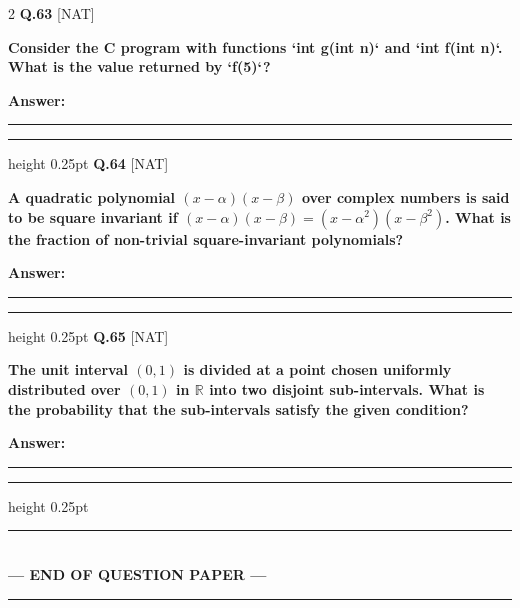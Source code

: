 \documentclass[a4paper,10pt,twoside]{article}
\begin{document}
\begin{multicols}{2}
\noindent\textbf{Q.63} \hfill {\footnotesize\textsf{[NAT]}}
\par\vspace{2pt}
{\bfseries Consider the C program with functions `int g(int n)` and `int f(int n)`. What is the value returned by `f(5)`? \par}
\par\vspace{3pt}\noindent\textbf{Answer:} \rule{3.2cm}{0.4pt}
\par\vspace{6pt}\hrule height 0.25pt\vspace{6pt}
\noindent\textbf{Q.64} \hfill {\footnotesize\textsf{[NAT]}}
\par\vspace{2pt}
{\bfseries A quadratic polynomial $(x - \alpha)(x - \beta)$ over complex numbers is said to be square invariant if $(x - \alpha)(x - \beta) = (x - \alpha^2)(x - \beta^2)$. What is the fraction of non-trivial square-invariant polynomials? \par}
\par\vspace{3pt}\noindent\textbf{Answer:} \rule{3.2cm}{0.4pt}
\par\vspace{6pt}\hrule height 0.25pt\vspace{6pt}
\noindent\textbf{Q.65} \hfill {\footnotesize\textsf{[NAT]}}
\par\vspace{2pt}
{\bfseries The unit interval $(0, 1)$ is divided at a point chosen uniformly distributed over $(0, 1)$ in $\mathbb{R}$ into two disjoint sub-intervals. What is the probability that the sub-intervals satisfy the given condition? \par}
\par\vspace{3pt}\noindent\textbf{Answer:} \rule{3.2cm}{0.4pt}
\par\vspace{6pt}\hrule height 0.25pt\vspace{6pt}
\end{multicols}
\vspace{8pt}
\begin{center}
\rule{0.35\linewidth}{0.5pt}\\[2pt]
\textbf{\small --- END OF QUESTION PAPER ---}\\[-8pt]
\rule{0.35\linewidth}{0.5pt}
\end{center}
\vspace{10pt}
\end{document}

